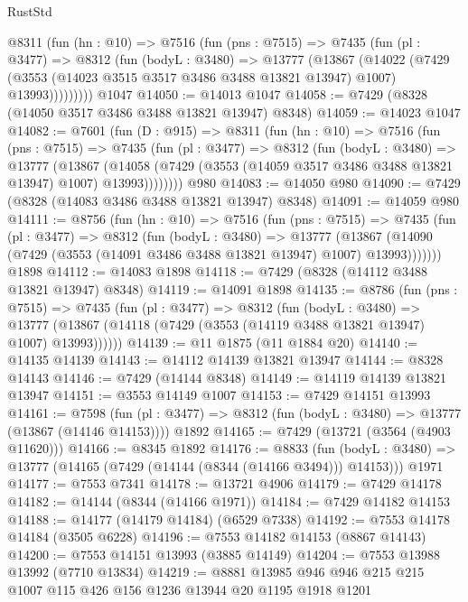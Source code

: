 \begin{lexlean}{RustStd}
\begin{coremodule}
      @8311
        (fun (hn : @10) =>
        @7516
          (fun (pns : @7515) =>
          @7435
            (fun (pl : @3477) =>
            @8312
              (fun (bodyL : @3480) =>
              @13777
                (@13867
                  (@14022
                    (@7429
                      (@3553 (@14023 @3515 @3517 @3486 @3488 @13821 @13947) @1007)
                      @13993)))))))))
    @1047
@14050 := @14013 @1047
@14058 := @7429 (@8328 (@14050 @3517 @3486 @3488 @13821 @13947) @8348)
@14059 := @14023 @1047
@14082 := @7601
    (fun (D : @915) =>
    @8311
      (fun (hn : @10) =>
      @7516
        (fun (pns : @7515) =>
        @7435
          (fun (pl : @3477) =>
          @8312
            (fun (bodyL : @3480) =>
            @13777
              (@13867
                (@14058 (@7429 (@3553 (@14059 @3517 @3486 @3488 @13821 @13947) @1007) @13993))))))))
    @980
@14083 := @14050 @980
@14090 := @7429 (@8328 (@14083 @3486 @3488 @13821 @13947) @8348)
@14091 := @14059 @980
@14111 := @8756
    (fun (hn : @10) =>
    @7516
      (fun (pns : @7515) =>
      @7435
        (fun (pl : @3477) =>
        @8312
          (fun (bodyL : @3480) =>
          @13777
            (@13867 (@14090 (@7429 (@3553 (@14091 @3486 @3488 @13821 @13947) @1007) @13993)))))))
    @1898
@14112 := @14083 @1898
@14118 := @7429 (@8328 (@14112 @3488 @13821 @13947) @8348)
@14119 := @14091 @1898
@14135 := @8786
    (fun (pns : @7515) =>
    @7435
      (fun (pl : @3477) =>
      @8312
        (fun (bodyL : @3480) =>
        @13777 (@13867 (@14118 (@7429 (@3553 (@14119 @3488 @13821 @13947) @1007) @13993))))))
@14139 := @11 @1875 (@11 @1884 @20)
@14140 := @14135 @14139
@14143 := @14112 @14139 @13821 @13947
@14144 := @8328 @14143
@14146 := @7429 (@14144 @8348)
@14149 := @14119 @14139 @13821 @13947
@14151 := @3553 @14149 @1007
@14153 := @7429 @14151 @13993
@14161 := @7598
    (fun (pl : @3477) => @8312 (fun (bodyL : @3480) => @13777 (@13867 (@14146 @14153))))
    @1892
@14165 := @7429 (@13721 (@3564 (@4903 @11620)))
@14166 := @8345 @1892
@14176 := @8833
    (fun (bodyL : @3480) => @13777 (@14165 (@7429 (@14144 (@8344 (@14166 @3494))) @14153)))
    @1971
@14177 := @7553 @7341
@14178 := @13721 @4906
@14179 := @7429 @14178
@14182 := @14144 (@8344 (@14166 @1971))
@14184 := @7429 @14182 @14153
@14188 := @14177 (@14179 @14184) (@6529 @7338)
@14192 := @7553 @14178 @14184 (@3505 @6228)
@14196 := @7553 @14182 @14153 (@8867 @14143)
@14200 := @7553 @14151 @13993 (@3885 @14149)
@14204 := @7553 @13988 @13992 (@7710 @13834)
@14219 := @8881 @13985 @946 @946 @215 @215 @1007 @115 @426 @156 @1236 @13944 @20 @1195 @1918 @1201

\end{coremodule}
\end{lexlean}

